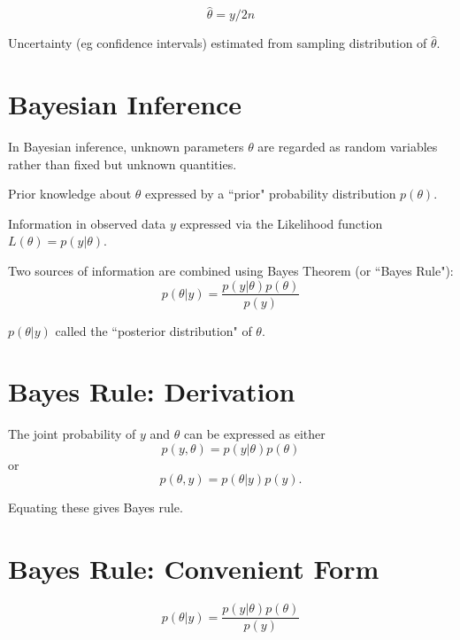 \begin{equation*}
\hat \theta  = y/2n
\end{equation*}

Uncertainty (eg confidence intervals) estimated from sampling distribution of $\hat \theta$.
    \es\bs

\section*{\hfil Bayesian Inference}

In Bayesian inference, unknown parameters $\theta $
 are regarded as random variables rather than fixed but unknown quantities.

Prior knowledge about $\theta $
 expressed by a ``prior" probability distribution $p\left( \theta  \right)$.

Information in observed data $y$ expressed via the Likelihood function
$L(\theta) = p\left( {\left. y \right|\theta } \right)$.

Two sources of information are combined using Bayes Theorem (or ``Bayes Rule"):
\begin{equation*}
p\left( {\left.
\theta  \right|y} \right) = \frac{{p\left( {\left. y \right|\theta }
\right)p\left( \theta \right)}}{{p\left( y \right)}} 
\end{equation*}

$p\left( {\left. \theta  \right|y} \right)$ called the ``posterior distribution" of
$\theta $.

\es\bs

\section*{\hfil Bayes Rule: Derivation}

The joint probability of $y$ and $\theta $
 can be expressed as either
$$p\left( {y,\theta } \right) = p\left( {\left. y \right|\theta } \right)p\left( \theta
\right)$$
    or
$$
p\left( {\theta ,y} \right) = p\left( {\left. \theta  \right|y}
\right)p\left( y \right).
$$

Equating these gives Bayes rule.

    \es\bs

\es\bs
\section*{Bayes Rule: Convenient Form}

\begin{equation*}
p\left( {\left.
\theta  \right|y} \right) = \frac{{p\left( {\left. y \right|\theta }
\right)p\left( \theta \right)}}{{p\left( y \right)}} 
\end{equation*}

